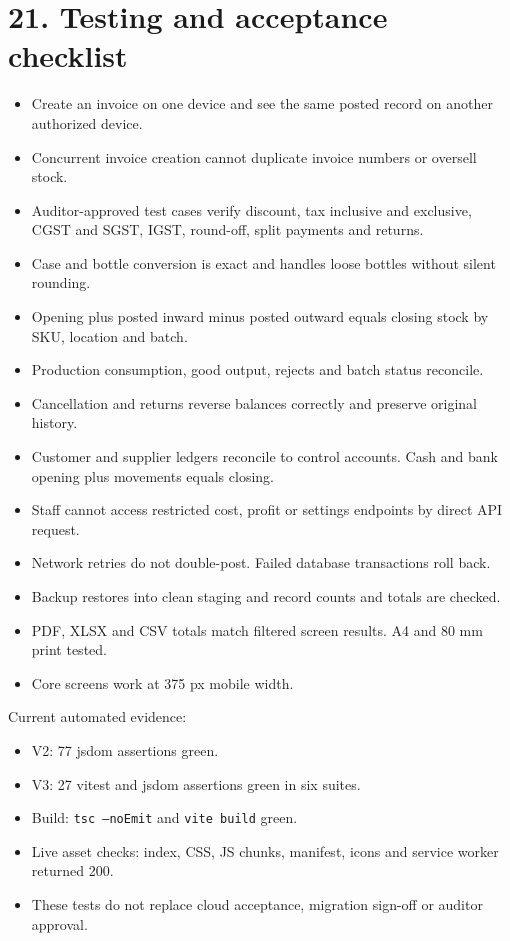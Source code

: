 \documentclass[11pt]{article}
\begin{document}
\section{21. Testing and acceptance checklist}
\begin{itemize}[leftmargin=*,itemsep=2pt,topsep=2pt]
\item Create an invoice on one device and see the same posted record on another authorized device.
\item Concurrent invoice creation cannot duplicate invoice numbers or oversell stock.
\item Auditor-approved test cases verify discount, tax inclusive and exclusive, CGST and SGST, IGST, round-off, split payments and returns.
\item Case and bottle conversion is exact and handles loose bottles without silent rounding.
\item Opening plus posted inward minus posted outward equals closing stock by SKU, location and batch.
\item Production consumption, good output, rejects and batch status reconcile.
\item Cancellation and returns reverse balances correctly and preserve original history.
\item Customer and supplier ledgers reconcile to control accounts. Cash and bank opening plus movements equals closing.
\item Staff cannot access restricted cost, profit or settings endpoints by direct API request.
\item Network retries do not double-post. Failed database transactions roll back.
\item Backup restores into clean staging and record counts and totals are checked.
\item PDF, XLSX and CSV totals match filtered screen results. A4 and 80 mm print tested.
\item Core screens work at 375 px mobile width.
\end{itemize}
Current automated evidence:
\begin{itemize}[leftmargin=*,itemsep=2pt,topsep=2pt]
\item V2: 77 jsdom assertions green.
\item V3: 27 vitest and jsdom assertions green in six suites.
\item Build: \texttt{tsc --noEmit} and \texttt{vite build} green.
\item Live asset checks: index, CSS, JS chunks, manifest, icons and service worker returned 200.
\item These tests do not replace cloud acceptance, migration sign-off or auditor approval.
\end{itemize}
\clearpage
\end{document}
